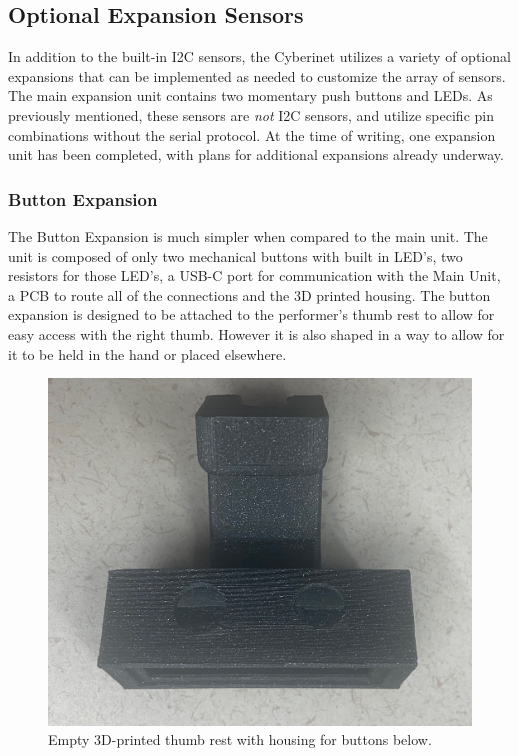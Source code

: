 \subsection{Optional Expansion Sensors}
In addition to the built-in I2C sensors, the Cyberinet utilizes a variety of optional expansions that can be implemented as needed to customize the array of sensors. The main expansion unit contains two momentary push buttons and LEDs. As previously mentioned, these sensors are \emph{not} I2C sensors, and utilize specific pin combinations without the serial protocol. At the time of writing, one expansion unit has been completed, with plans for additional expansions already underway.

\subsubsection{Button Expansion}

The Button Expansion is much simpler when compared to the main unit. The unit is composed of only two mechanical buttons with built in LED's, two resistors for those LED's, a USB-C port for communication with the Main Unit, a PCB to route all of the connections and the 3D printed housing. The button expansion is designed to be attached to the performer's thumb rest to allow for easy access with the right thumb. However it is also shaped in a way to allow for it to be held in the hand or placed elsewhere.

\begin{center}
    \begin{figure}
        \centering
        \includegraphics[scale=0.1]{diagrams/builtUnits/buttonhousingEmpty.JPG}
        \caption{Empty 3D-printed thumb rest with housing for buttons below.}
        \label{fig:buttonThumbrest}
    \end{figure}
\end{center}

